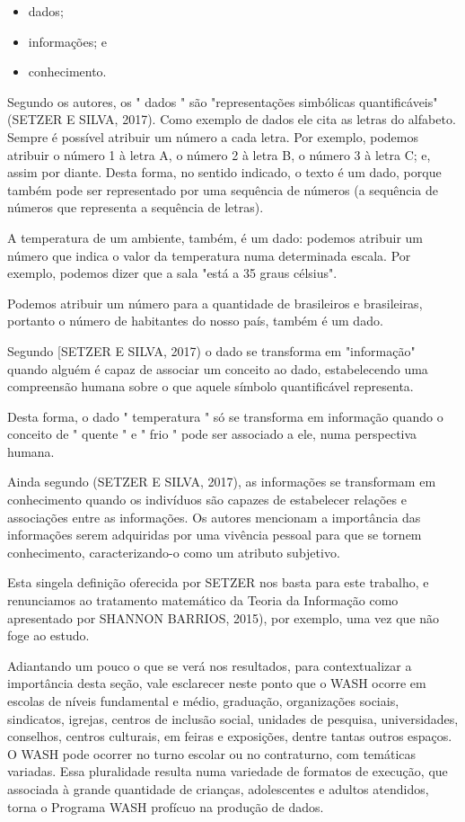 \begin{itemize}
\item dados;
\item informações; e
\item conhecimento.
\end{itemize}

Segundo os autores, os " dados " são "representações simbólicas quantificáveis" (SETZER E SILVA, 2017). Como exemplo de dados ele cita as letras do alfabeto. Sempre é possível atribuir um número a cada letra. Por exemplo, podemos atribuir o número 1 à letra A, o número 2 à letra B, o número 3 à letra C; e, assim por diante. Desta forma, no sentido indicado, o texto é um dado, porque também pode ser representado por uma sequência de números (a sequência de números que representa a sequência de letras).

A temperatura de um ambiente, também, é um dado: podemos atribuir um número que indica o valor da temperatura numa determinada escala. Por exemplo, podemos dizer que a sala "está a 35 graus célsius".

Podemos atribuir um número para a quantidade de brasileiros e brasileiras, portanto o número de habitantes do nosso país, também é um dado.

Segundo [SETZER E SILVA, 2017) o dado se transforma em "informação" quando alguém é capaz de associar um conceito ao dado, estabelecendo uma compreensão humana sobre o que aquele símbolo quantificável representa.

Desta forma, o dado " temperatura " só se transforma em informação quando o conceito de " quente " e " frio " pode ser associado a ele, numa perspectiva humana.

Ainda segundo (SETZER E SILVA, 2017), as informações se transformam em conhecimento quando os indivíduos são capazes de estabelecer relações e associações entre as informações. Os autores mencionam a importância das informações serem adquiridas por uma vivência pessoal para que se tornem conhecimento, caracterizando-o como um atributo subjetivo.

Esta singela definição oferecida por SETZER nos basta para este trabalho, e renunciamos ao tratamento matemático da Teoria da Informação como apresentado por SHANNON BARRIOS, 2015), por exemplo, uma vez que não foge ao estudo.

Adiantando um pouco o que se verá nos resultados, para contextualizar a importância desta seção, vale esclarecer neste ponto que o WASH ocorre  em escolas de níveis fundamental e médio, graduação, organizações sociais, sindicatos, igrejas, centros de inclusão social, unidades de pesquisa, universidades,  conselhos, centros culturais, em feiras e exposições, dentre tantas outros espaços. O WASH pode ocorrer no turno escolar ou no contraturno, com temáticas variadas.  Essa pluralidade resulta numa variedade de formatos de execução, que associada à grande quantidade de crianças, adolescentes e adultos atendidos, torna o Programa WASH profícuo na produção de dados.

